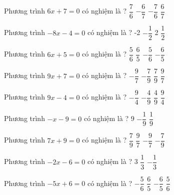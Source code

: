 \begin{ex} 
	Phương trình $6x+7=0$ có nghiệm là ? 
	\choice
	{$ \dfrac{ 7 }{ 6 } $}
	{$- \dfrac{ 6 }{ 7 } $}
	{\True $- \dfrac{ 7 }{ 6 } $}
	{$ \dfrac{ 6 }{ 7 } $}
	\loigiai{} 
\end{ex}

\begin{ex} 
	Phương trình $-8x-4=0$ có nghiệm là ? 
	\choice
	{-2}
	{\True $- \dfrac{ 1 }{ 2 } $}
	{2}
	{$ \dfrac{ 1 }{ 2 } $}
	\loigiai{} 
\end{ex}

\begin{ex} 
	Phương trình $6x+5=0$ có nghiệm là ? 
	\choice
	{$ \dfrac{ 5 }{ 6 } $}
	{$ \dfrac{ 6 }{ 5 } $}
	{\True $- \dfrac{ 5 }{ 6 } $}
	{$- \dfrac{ 6 }{ 5 } $}
	\loigiai{} 
\end{ex}

\begin{ex} 
	Phương trình $9x+7=0$ có nghiệm là ? 
	\choice
	{$- \dfrac{ 9 }{ 7 } $}
	{\True $- \dfrac{ 7 }{ 9 } $}
	{$ \dfrac{ 7 }{ 9 } $}
	{$ \dfrac{ 9 }{ 7 } $}
	\loigiai{} 
\end{ex}

\begin{ex} 
	Phương trình $9x-4=0$ có nghiệm là ? 
	\choice
	{$- \dfrac{ 9 }{ 4 } $}
	{$- \dfrac{ 4 }{ 9 } $}
	{\True $ \dfrac{ 4 }{ 9 } $}
	{$ \dfrac{ 9 }{ 4 } $}
	\loigiai{} 
\end{ex}

\begin{ex} 
	Phương trình $-x-9=0$ có nghiệm là ? 
	\choice
	{9}
	{}
	{$- \dfrac{ 1 }{ 9 } $}
	{$ \dfrac{ 1 }{ 9 } $}
	\loigiai{} 
\end{ex}

\begin{ex} 
	Phương trình $7x+9=0$ có nghiệm là ? 
	\choice
	{$ \dfrac{ 7 }{ 9 } $}
	{$ \dfrac{ 9 }{ 7 } $}
	{\True $- \dfrac{ 9 }{ 7 } $}
	{$- \dfrac{ 7 }{ 9 } $}
	\loigiai{} 
\end{ex}

\begin{ex} 
	Phương trình $-2x-6=0$ có nghiệm là ? 
	\choice
	{3}
	{$ \dfrac{ 1 }{ 3 } $}
	{$- \dfrac{ 1 }{ 3 } $}
	{}
	\loigiai{} 
\end{ex}

\begin{ex} 
	Phương trình $-5x+6=0$ có nghiệm là ? 
	\choice
	{$- \dfrac{ 5 }{ 6 } $}
	{\True $ \dfrac{ 6 }{ 5 } $}
	{$- \dfrac{ 6 }{ 5 } $}
	{$ \dfrac{ 5 }{ 6 } $}
	\loigiai{} 
\end{ex}

